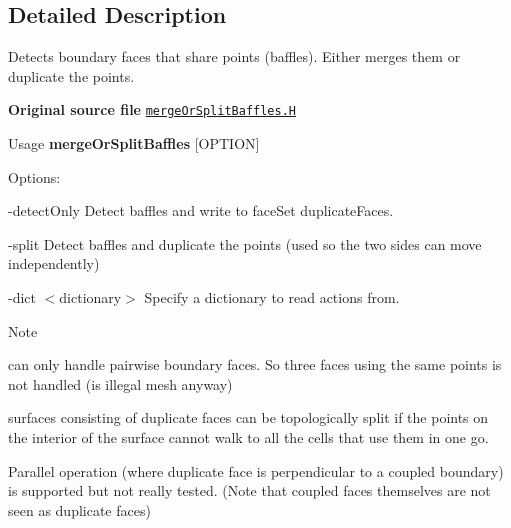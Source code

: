 \subsection{Detailed Description}
Detects boundary faces that share points (baffles). Either merges them or duplicate the points. 

{\bfseries Original source file} \href{../../../home/carlo/data/GeN-Foam/GeN-Foam_ffn/GeN-Foam/GeN-Foam/include/mergeOrSplitBaffles.H}{\tt merge\+Or\+Split\+Baffles.\+H}

\label{_Description}%
 \begin{DoxyParagraph}{Usage}
{\bfseries merge\+Or\+Split\+Baffles} \mbox{[}O\+P\+T\+I\+ON\mbox{]}
\end{DoxyParagraph}
Options\+:
\begin{DoxyItemize}
\item \begin{DoxyParagraph}{-\/detect\+Only}
Detect baffles and write to face\+Set duplicate\+Faces.
\end{DoxyParagraph}

\item \begin{DoxyParagraph}{-\/split}
Detect baffles and duplicate the points (used so the two sides can move independently)
\end{DoxyParagraph}

\item \begin{DoxyParagraph}{-\/dict $<$dictionary$>$}
Specify a dictionary to read actions from.
\end{DoxyParagraph}
\begin{DoxyNote}{Note}

\end{DoxyNote}

\end{DoxyItemize}

can only handle pairwise boundary faces. So three faces using the same points is not handled (is illegal mesh anyway)


\begin{DoxyItemize}
\item surfaces consisting of duplicate faces can be topologically split if the points on the interior of the surface cannot walk to all the cells that use them in one go.
\item Parallel operation (where duplicate face is perpendicular to a coupled boundary) is supported but not really tested. (Note that coupled faces themselves are not seen as duplicate faces) 
\end{DoxyItemize}

